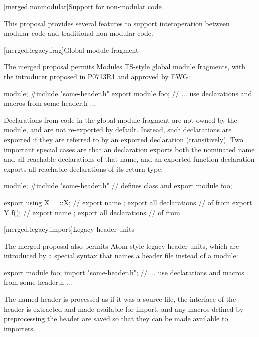 [merged.nonmodular]{Support for non-modular code}

\pnum
This proposal provides several features to support
interoperation between modular code
and traditional non-modular code.

[merged.legacy.frag]{Global module fragment}

\pnum
The merged proposal permits Modules TS-style global module fragments,
with the  introducer proposed in P0713R1
and approved by EWG:

\begin{codeblock}
module;
#include "some-header.h"
export module foo;
// ... use declarations and macros from some-header.h ...
\end{codeblock}

\pnum
Declarations from code in the global module fragment
are not owned by the module,
and are not re-exported by default.
Instead, such declarations are exported if they are referred to
by an exported declaration (transitively).
Two important special cases are that an 
declaration exports both the nominated name and
all reachable declarations of that name,
and an exported function declaration exports
all reachable declarations of its return type:

\begin{codeblock}
module;
#include "some-header.h" // defines class  and 
export module foo;

export using X = ::X; // export name ; export all declarations
                      // of  from 
export Y f(); // export name ; export all declarations
              // of  from 
\end{codeblock}

[merged.legacy.import]{Legacy header units}

\pnum
The merged proposal also permits Atom-style legacy header units,
which are introduced by a special  syntax
that names a header file instead of a module:

\begin{codeblock}
export module foo;
import "some-header.h";
// ... use declarations and macros from some-header.h ...
\end{codeblock}

\pnum
The named header is processed as if it was a source file,
the interface of the header is extracted and made available for import,
and any macros defined by preprocessing the header are saved
so that they can be made available to importers.

